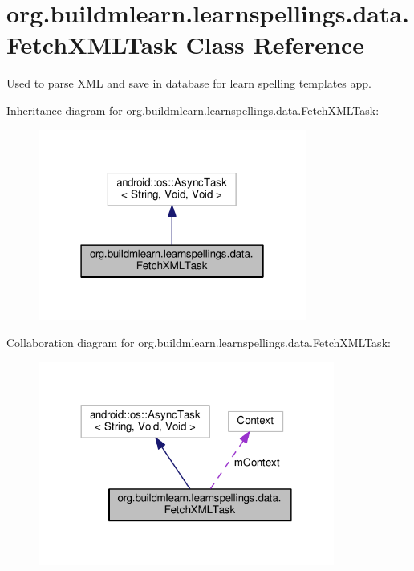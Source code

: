 \hypertarget{classorg_1_1buildmlearn_1_1learnspellings_1_1data_1_1FetchXMLTask}{}\section{org.\+buildmlearn.\+learnspellings.\+data.\+Fetch\+X\+M\+L\+Task Class Reference}
\label{classorg_1_1buildmlearn_1_1learnspellings_1_1data_1_1FetchXMLTask}


Used to parse X\+ML and save in database for learn spelling template\textquotesingle{}s app.  




Inheritance diagram for org.\+buildmlearn.\+learnspellings.\+data.\+Fetch\+X\+M\+L\+Task\+:
\nopagebreak
\begin{figure}[H]
\begin{center}
\leavevmode
\includegraphics[width=250pt]{classorg_1_1buildmlearn_1_1learnspellings_1_1data_1_1FetchXMLTask__inherit__graph}
\end{center}
\end{figure}


Collaboration diagram for org.\+buildmlearn.\+learnspellings.\+data.\+Fetch\+X\+M\+L\+Task\+:
\nopagebreak
\begin{figure}[H]
\begin{center}
\leavevmode
\includegraphics[width=276pt]{classorg_1_1buildmlearn_1_1learnspellings_1_1data_1_1FetchXMLTask__coll__graph}
\end{center}
\end{figure}
